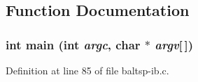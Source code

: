 \subsection{Function Documentation}
\hypertarget{bin_2baltsp-ib_8c_0ddf1224851353fc92bfbff6f499fa97}{
\subsubsection[{main}]{\setlength{\rightskip}{0pt plus 5cm}int main (int {\em argc}, \/  char $\ast$ {\em argv}\mbox{[}$\,$\mbox{]})}}
\label{bin_2baltsp-ib_8c_0ddf1224851353fc92bfbff6f499fa97}




Definition at line 85 of file baltsp-ib.c.

